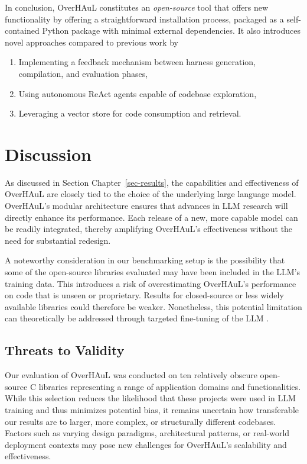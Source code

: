 \documentclass[
  a4paper,
]{scrreprt}
\providecommand{\tightlist}{%
  \setlength{\itemsep}{0pt}\setlength{\parskip}{0pt}}
\theoremstyle{definition}
\theoremstyle{remark}
\begin{document}
In conclusion, OverHAuL constitutes an \emph{open-source} tool that
offers new functionality by offering a straightforward installation
process, packaged as a self-contained Python package with minimal
external dependencies. It also introduces novel approaches compared to
previous work by

\begin{enumerate}
\def\labelenumi{\arabic{enumi}.}
\tightlist
\item
  Implementing a feedback mechanism between harness generation,
  compilation, and evaluation phases,
\item
  Using autonomous ReAct agents capable of codebase exploration,
\item
  Leveraging a vector store for code consumption and retrieval.
\end{enumerate}


\chapter{Discussion}\label{discussion}

As discussed in Section Chapter~\ref{sec-results}, the capabilities and
effectiveness of OverHAuL are closely tied to the choice of the
underlying large language model. OverHAuL's modular architecture ensures
that advances in LLM research will directly enhance its performance.
Each release of a new, more capable model can be readily integrated,
thereby amplifying OverHAuL's effectiveness without the need for
substantial redesign.

A noteworthy consideration in our benchmarking setup is the possibility
that some of the open-source libraries evaluated may have been included
in the LLM's training data. This introduces a risk of overestimating
OverHAuL's performance on code that is unseen or proprietary. Results
for closed-source or less widely available libraries could therefore be
weaker. Nonetheless, this potential limitation can theoretically be
addressed through targeted fine-tuning of the LLM
\autocite{openaidocs2025b,kim2025}.

\section{Threats to Validity}\label{threats-to-validity}

Our evaluation of OverHAuL was conducted on ten relatively obscure
open-source C libraries representing a range of application domains and
functionalities. While this selection reduces the likelihood that these
projects were used in LLM training and thus minimizes potential bias, it
remains uncertain how transferable our results are to larger, more
complex, or structurally different codebases. Factors such as varying
design paradigms, architectural patterns, or real-world deployment
contexts may pose new challenges for OverHAuL's scalability and
effectiveness.
\end{document}
